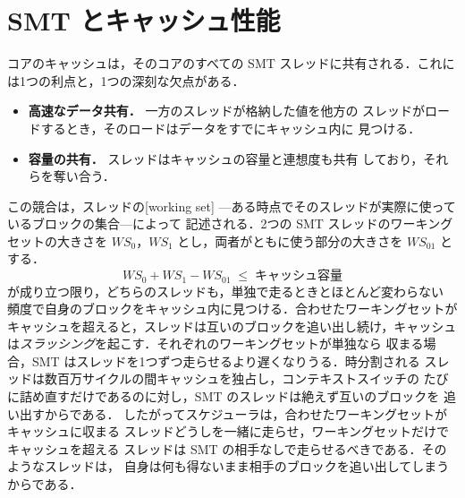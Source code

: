 \documentclass[../main.tex]{subfiles}
\begin{document}
\section{SMT とキャッシュ性能}
\label{sec:l18-smt-cache}

コアのキャッシュは，そのコアのすべての SMT スレッドに共有される．これに
は1つの利点と，1つの深刻な欠点がある．
\begin{itemize}
  \item \textbf{高速なデータ共有．} 一方のスレッドが格納した値を他方の
    スレッドがロードするとき，そのロードはデータをすでにキャッシュ内に
    見つける．
  \item \textbf{容量の共有．} スレッドはキャッシュの容量と連想度も共有
    しており，それらを奪い合う．
\end{itemize}

この競合は，スレッドの[working set]%
---ある時点でそのスレッドが実際に使っているブロックの集合---によって
記述される．2つの SMT スレッドのワーキングセットの大きさを
$\mathit{WS}_0$，$\mathit{WS}_1$ とし，両者がともに使う部分の大きさを
$\mathit{WS}_{01}$ とする．
\begin{equation}
  \mathit{WS}_0 + \mathit{WS}_1 - \mathit{WS}_{01} \;\le\; \text{キャッシュ容量}
  \label{eq:l18-ws}
\end{equation}
が成り立つ限り，どちらのスレッドも，単独で走るときとほとんど変わらない
頻度で自身のブロックをキャッシュ内に見つける．合わせたワーキングセットが
キャッシュを超えると，スレッドは互いのブロックを追い出し続け，キャッシュ
は\emph{スラッシング}を起こす．それぞれのワーキングセットが単独なら
収まる場合，SMT はスレッドを1つずつ走らせるより遅くなりうる．時分割される
スレッドは数百万サイクルの間キャッシュを独占し，コンテキストスイッチの
たびに詰め直すだけであるのに対し，SMT のスレッドは絶えず互いのブロックを
追い出すからである．%
したがってスケジューラは，合わせたワーキングセットがキャッシュに収まる
スレッドどうしを一緒に走らせ，ワーキングセットだけでキャッシュを超える
スレッドは SMT の相手なしで走らせるべきである．そのようなスレッドは，
自身は何も得ないまま相手のブロックを追い出してしまうからである．
\end{document}
